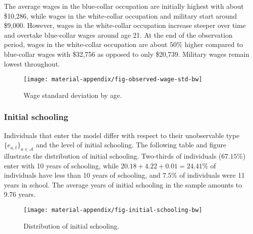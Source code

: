 The average wages in the blue-collar occupation are initially highest with about \$10,286, while wages in the white-collar occupation and military start around \$9,000. However, wages in the white-collar occupation increase steeper over time and overtake blue-collar wages around age 21. At the end of the observation period, wages in the white-collar occupation are about $50\%$ higher compared to blue-collar wages with \$32,756 as opposed to only \$20,739. Military wages remain lowest throughout.
\newpage

\begin{figure}[h]\centering
\caption{Wage standard deviation by age.}\label{fig:WageMoments}
\texttt{[image: material-appendix/fig-observed-wage-std-bw]}
\end{figure}

\subsubsection*{Initial schooling}

Individuals that enter the model differ with respect to their unobservable type $\{e_{a,t}\}_{a \in \mathcal{A}}$ and the level of initial schooling. The following table and figure illustrate the distribution of initial schooling. Two-thirds of individuals ($67.15\%$) enter with 10 years of schooling, while $20.18 + 4.22 + 0.01 = 24.41\%$ of individuals have less than 10 years of schooling, and $7.5\%$ of individuals were 11 years in school. The average years of initial schooling in the sample amounts to 9.76 years.

\begin{figure}[h]\centering
\caption{Distribution of initial schooling.}\label{fig:InitialSchooling}
\texttt{[image: material-appendix/fig-initial-schooling-bw]}
\end{figure}

